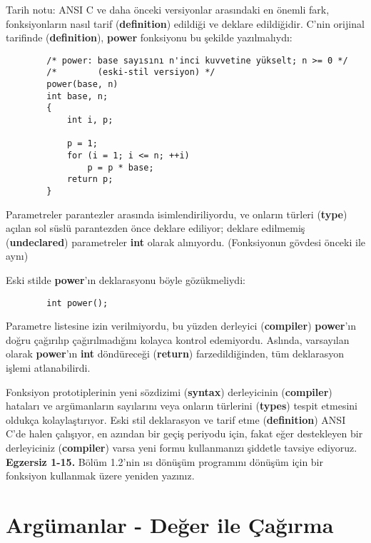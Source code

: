 \documentclass[a4paper,12pt,oneside]{book}
\begin{document}
\par Tarih notu: ANSI C ve daha önceki versiyonlar arasındaki en önemli fark, fonksiyonların nasıl tarif (\textbf{definition}) edildiği ve deklare edildiğidir. C'nin orijinal tarifinde (\textbf{definition}), \textbf{power} fonksiyonu bu şekilde yazılmalıydı:
\begin{lstlisting}
		/* power: base sayısını n'inci kuvvetine yükselt; n >= 0 */
		/*		  (eski-stil versiyon) */
		power(base, n)
		int base, n;
		{
			int i, p;

			p = 1;
			for (i = 1; i <= n; ++i)
				p = p * base;
			return p;
		}
\end{lstlisting}
Parametreler parantezler arasında isimlendiriliyordu, ve onların türleri (\textbf{type}) açılan sol süslü parantezden önce deklare ediliyor; deklare edilmemiş (\textbf{undeclared}) parametreler \textbf{int} olarak alınıyordu. (Fonksiyonun gövdesi önceki ile aynı)
\par Eski stilde \textbf{power}'ın deklarasyonu böyle gözükmeliydi:
\begin{lstlisting}
		int power();
\end{lstlisting}
Parametre listesine izin verilmiyordu, bu yüzden derleyici (\textbf{compiler}) \textbf{power}'ın doğru çağırılıp çağırılmadığını kolayca kontrol edemiyordu. Aslında, varsayılan olarak \textbf{power}'ın \textbf{int} döndüreceği (\textbf{return}) farzedildiğinden, tüm deklarasyon işlemi atlanabilirdi.
\par Fonksiyon prototiplerinin yeni sözdizimi (\textbf{syntax}) derleyicinin (\textbf{compiler}) hataları ve argümanların sayılarını veya onların türlerini (\textbf{types}) tespit etmesini oldukça kolaylaştırıyor. Eski stil deklarasyon ve tarif etme (\textbf{definition}) ANSI C'de halen çalışıyor, en azından bir geçiş periyodu için, fakat eğer destekleyen bir derleyiciniz (\textbf{compiler}) varsa yeni formu kullanmanızı şiddetle tavsiye ediyoruz. \\


\textbf{Egzersiz 1-15.} Bölüm 1.2'nin ısı dönüşüm programını dönüşüm için bir fonksiyon kullanmak üzere yeniden yazınız.

\section{Argümanlar - Değer ile Çağırma}
\end{document}
